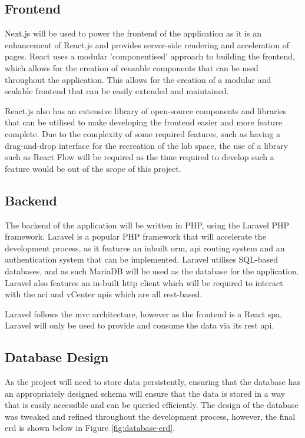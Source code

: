 \subsection{Frontend}
\label{design:web-application:frontend}
Next.js will be used to power the frontend of the application as it is an enhancement of React.js and provides server-side rendering and acceleration of pages. React uses a modular 'componentised' approach to building the frontend, which allows for the creation of reusable components that can be used throughout the application. This allows for the creation of a modular and scalable frontend that can be easily extended and maintained.

React.js also has an extensive library of open-source components and libraries that can be utilised to make developing the frontend easier and more feature complete. Due to the complexity of some required features, such as having a drag-and-drop interface for the recreation of the lab space, the use of a library such as React Flow will be required as the time required to develop such a feature would be out of the scope of this project.

\subsection{Backend}
\label{design:web-application:backend}
The backend of the application will be written in PHP, using the Laravel PHP framework. Laravel is a popular PHP framework that will accelerate the development process, as it features an inbuilt \gls{orm}, \gls{api} routing system and an authentication system that can be implemented. Laravel utilises SQL-based databases, and as such MariaDB will be used as the database for the application. Laravel also features an in-built \gls{http} client which will be required to interact with the \gls{aci} and vCenter \gls{api}s which are all \gls{rest}-based.

Laravel follows the \gls{mvc} architecture, however as the frontend is a React \gls{spa}, Laravel will only be used to provide and consume the data via its \gls{rest} \gls{api}.


\subsection{Database Design}
\label{design:web-application:database}
As the project will need to store data persistently, ensuring that the database has an appropriately designed schema will ensure that the data is stored in a way that is easily accessible and can be queried efficiently. The design of the database was tweaked and refined throughout the development process, however, the final \gls{erd} is shown below in Figure \ref{fig:database-erd}.

